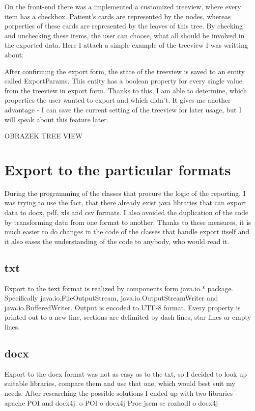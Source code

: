 \documentclass[thesis=B,english]{FITthesis}[2012/10/20]
\begin{document}
On the front-end there was a implemented a customized treeview, where every item has a checkbox. Patient's cards are represented by the nodes, whereas porperties of these cards are represented by the leaves of this tree. By checking and unchecking these items, the user can choose, what all should be involved in the exported data.
Here I attach a simple example of the treeview I was writting about:



After confirming the export form, the state of the treeview is saved to an entity called ExportParams. This entity has a boolean property for every single value from the treeview in export form. Thanks to this, I am able to determine, which properties the user wanted to export and which didn't. It gives me another advantage - I can save the current setting of the treeview for later usage, but I will speak about this feature later.
 
OBRAZEK TREE VIEW
\section{Export to the particular formats}
During the  programming of the classes that procure the logic of the reporting, I was trying to use the fact, that there already exist java libraries that can export data to docx, pdf, xls and csv formats. I also avoided the duplication of the code by transforming data from one format to another. Thanks to these measures, it is much easier to do changes in the code of the classes that handle export itself and it also eases the understanding of the code to anybody, who would read it.
\subsection{txt}
Export to the text format is realized by components form java.io.* package. Specifically java.io.FileOutputStream, java.io.OutputStreamWriter and java.io.BufferedWriter. Output is encoded to UTF-8 format. Every property is printed out to a new line, sections are delimited by dash lines, star lines or empty lines.
\subsection{docx}
Export to the docx format was not as easy as to the txt, so I decided to look up suitable libraries, compare them and use that one, which would best suit my needs. After researching the possible solutions I ended up with two libraries - apache POI and docx4j.
o POI
o docx4j
Proc jsem se rozhodl o docx4j
\end{document}
